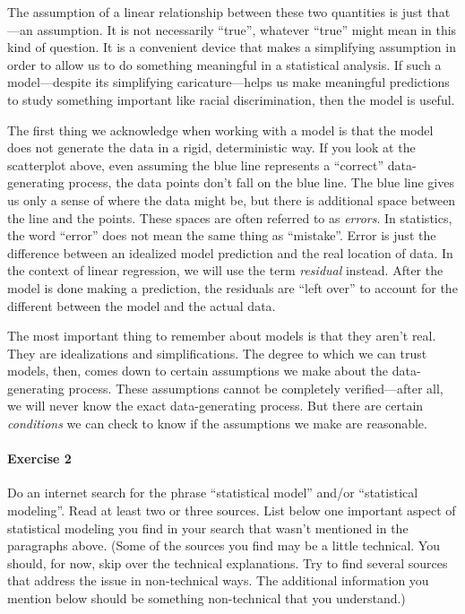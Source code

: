 \documentclass[
]{book}
\begin{document}
The assumption of a linear relationship between these two quantities is just that---an assumption. It is not necessarily ``true'', whatever ``true'' might mean in this kind of question. It is a convenient device that makes a simplifying assumption in order to allow us to do something meaningful in a statistical analysis. If such a model---despite its simplifying caricature---helps us make meaningful predictions to study something important like racial discrimination, then the model is useful.

The first thing we acknowledge when working with a model is that the model does not generate the data in a rigid, deterministic way. If you look at the scatterplot above, even assuming the blue line represents a ``correct'' data-generating process, the data points don't fall on the blue line. The blue line gives us only a sense of where the data might be, but there is additional space between the line and the points. These spaces are often referred to as \emph{errors}. In statistics, the word ``error'' does not mean the same thing as ``mistake''. Error is just the difference between an idealized model prediction and the real location of data. In the context of linear regression, we will use the term \emph{residual} instead. After the model is done making a prediction, the residuals are ``left over'' to account for the different between the model and the actual data.

The most important thing to remember about models is that they aren't real. They are idealizations and simplifications. The degree to which we can trust models, then, comes down to certain assumptions we make about the data-generating process. These assumptions cannot be completely verified---after all, we will never know the exact data-generating process. But there are certain \emph{conditions} we can check to know if the assumptions we make are reasonable.

\hypertarget{exercise-2-3}{%
\paragraph*{Exercise 2}\label{exercise-2-3}}

Do an internet search for the phrase ``statistical model'' and/or ``statistical modeling''. Read at least two or three sources. List below one important aspect of statistical modeling you find in your search that wasn't mentioned in the paragraphs above. (Some of the sources you find may be a little technical. You should, for now, skip over the technical explanations. Try to find several sources that address the issue in non-technical ways. The additional information you mention below should be something non-technical that you understand.)
\end{document}

